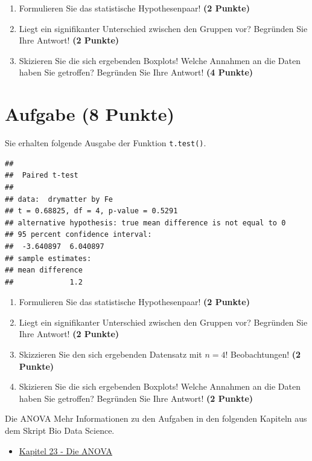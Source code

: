 \documentclass[a4paper, 10pt]{scrartcl}\usepackage[]{graphicx}\usepackage[]{xcolor}
\makeatletter
\newenvironment{kframe}{%
 \def\at@end@of@kframe{}%
 \ifinner\ifhmode%
  \def\at@end@of@kframe{\end{minipage}}%
  \begin{minipage}{\columnwidth}%
 \fi\fi%
 \def\FrameCommand##1{\hskip\@totalleftmargin \hskip-\fboxsep
 \colorbox{shadecolor}{##1}\hskip-\fboxsep
     \hskip-\linewidth \hskip-\@totalleftmargin \hskip\columnwidth}%
 \MakeFramed {\advance\hsize-\width
   \@totalleftmargin\z@ \linewidth\hsize
   \@setminipage}}%
 {\par\unskip\endMakeFramed%
 \at@end@of@kframe}
\newenvironment{knitrout}{}{} %
\makeatother
\begin{document}
\begin{enumerate}
  \item Formulieren Sie das statistische Hypothesenpaar! \textbf{(2
Punkte)}
\item Liegt ein signifikanter Unterschied zwischen den Gruppen vor?
  Begr{\"u}nden Sie Ihre Antwort! \textbf{(2 Punkte)}
\item Skizieren Sie die sich ergebenden Boxplots! Welche Annahmen an die Daten haben Sie getroffen? Begr{\"u}nden Sie Ihre Antwort! \textbf{(4 Punkte)} 
\end{enumerate}
 
\clearpage

\section{Aufgabe \hfill (8 Punkte)}

Sie erhalten folgende \Rlogo Ausgabe der Funktion \texttt{t.test()}.

\begin{knitrout}
\color{fgcolor}\begin{kframe}
\begin{verbatim}
## 
## 	Paired t-test
## 
## data:  drymatter by Fe
## t = 0.68825, df = 4, p-value = 0.5291
## alternative hypothesis: true mean difference is not equal to 0
## 95 percent confidence interval:
##  -3.640897  6.040897
## sample estimates:
## mean difference 
##             1.2
\end{verbatim}
\end{kframe}
\end{knitrout}


\begin{enumerate}
  \item Formulieren Sie das statistische Hypothesenpaar! \textbf{(2
Punkte)}
\item Liegt ein signifikanter Unterschied zwischen den Gruppen vor?
  Begr{\"u}nden Sie Ihre Antwort! \textbf{(2 Punkte)}
\item Skizzieren Sie den sich ergebenden Datensatz mit $n = 4$! Beobachtungen! \textbf{(2 Punkte)} 
\item Skizieren Sie die sich ergebenden Boxplots! Welche Annahmen an die Daten haben Sie getroffen? Begr{\"u}nden Sie Ihre Antwort! \textbf{(2 Punkte)} 
\end{enumerate}
 
\clearpage
\begin{graybox}{Die ANOVA}
Mehr Informationen zu den Aufgaben in den folgenden Kapiteln aus dem Skript Bio Data Science.
  \begin{itemize}
  \item \href{https://jkruppa.github.io/stat-tests-anova.html}{Kapitel 23 - Die ANOVA}
  \end{itemize}
\end{graybox}
\end{document}
